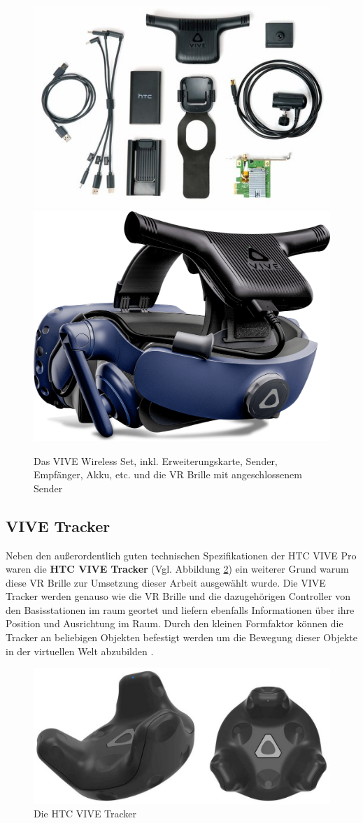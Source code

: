 \begin{figure}[h]
	\centering
	\includegraphics[width=0.4\linewidth]{Bilder/A27_WirelessKit}
	\includegraphics[width=0.32\linewidth]{Bilder/A28_Vive+Wireless}
	\caption{Das VIVE Wireless Set, inkl. Erweiterungskarte, Sender, Empfänger, Akku, etc. und die VR Brille mit angeschlossenem Sender \cite{A27,A28}}
	\label{fig:WirelessKit}
\end{figure}

\subsection{VIVE Tracker}\label{sec:TrackerVive}
Neben den außerordentlich guten technischen Spezifikationen der HTC VIVE Pro waren die \textbf{HTC VIVE Tracker} (Vgl. Abbildung \ref{fig:ViveTracker}) ein weiterer Grund warum diese VR Brille zur Umsetzung dieser Arbeit ausgewählt wurde. Die VIVE Tracker werden genauso wie die VR Brille und die dazugehörigen Controller von den Basisstationen im raum geortet und liefern ebenfalls Informationen über ihre Position und Ausrichtung im Raum. Durch den kleinen Formfaktor können die Tracker an beliebigen Objekten befestigt werden um die Bewegung dieser Objekte in der virtuellen Welt abzubilden \cite{30}.
\newline
\begin{figure}[h]
	\centering
	\includegraphics[width=0.42\linewidth]{Bilder/A29_ViveTracker}
	\caption{Die HTC VIVE Tracker \cite{A29}}
	\label{fig:ViveTracker}
\end{figure}

